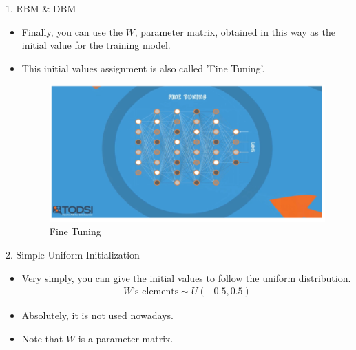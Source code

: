 \documentclass{beamer}
\begin{document}
	\begin{frame}{1. RBM \& DBM}
		\begin{itemize}
			\item Finally, you can use the $W$, parameter matrix, obtained in this way as the initial value for the training model.
			\item This initial values assignment is also called 'Fine Tuning'.
			\vspace{10pt}
			\begin{figure}[h]
				\centering
				\includegraphics[scale=0.4]{./rbm,dbm/rbm3_finetuning.PNG}	
				\caption{Fine Tuning}
				\label{fig:dbm2}	
			\end{figure}
		\end{itemize}
	\end{frame}	


	\begin{frame}{2. Simple Uniform Initialization}
		\begin{itemize}
			\item Very simply, you can give the initial values to follow the uniform distribution.
			\vspace{10pt}
			\begin{gather*}
			W\text{'s elements} \sim U(-0.5,0.5)  
			\end{gather*}
			\item Absolutely, it is not used nowadays.
			\item Note that $W$ is a parameter matrix.
		\end{itemize}
	\end{frame}	
\end{document}
